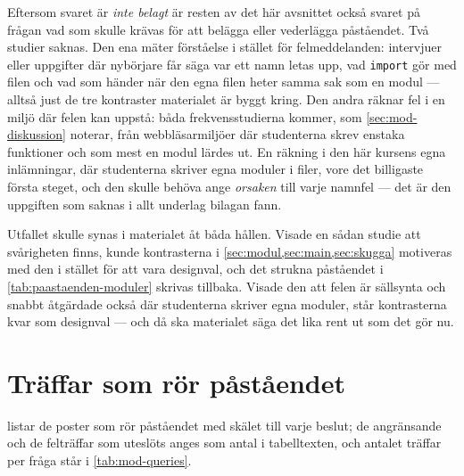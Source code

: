 Eftersom svaret är \emph{inte belagt} är resten av det här avsnittet
också svaret på frågan vad som skulle krävas för att belägga eller
vederlägga påståendet.  Två studier saknas.  Den ena mäter förståelse i
stället för felmeddelanden: intervjuer eller uppgifter där nybörjare får
säga var ett namn letas upp, vad \texttt{import} gör med
filen och vad som händer när den egna filen heter samma sak som en modul
--- alltså just de tre kontraster materialet är byggt kring.  Den andra
räknar fel i en miljö där felen kan uppstå: båda frekvensstudierna
kommer, som \cref{sec:mod-diskussion} noterar, från webbläsarmiljöer där
studenterna skrev enstaka funktioner och som mest en modul lärdes ut.  En
räkning i den här kursens egna inlämningar, där studenterna skriver egna
moduler i filer, vore det billigaste första steget, och den skulle
behöva ange \emph{orsaken} till varje namnfel --- det är den uppgiften
som saknas i allt underlag bilagan fann.

Utfallet skulle synas i materialet åt båda hållen.  Visade en sådan
studie att svårigheten finns, kunde kontrasterna i
\cref{sec:modul,sec:main,sec:skugga} motiveras med den i stället för att
vara designval, och det strukna påståendet i \cref{tab:paastaenden-moduler}
skrivas tillbaka.  Visade den att felen är sällsynta och snabbt
åtgärdade också där studenterna skriver egna moduler, står kontrasterna
kvar som designval --- och då ska materialet säga det lika rent ut som
det gör nu.

\section{Träffar som rör påståendet}
\label{sec:mod-traffar}

 listar de poster som rör påståendet med skälet
till varje beslut; de angränsande och de felträffar som uteslöts anges
som antal i tabelltexten, och antalet träffar per fråga står i
\cref{tab:mod-queries}.


